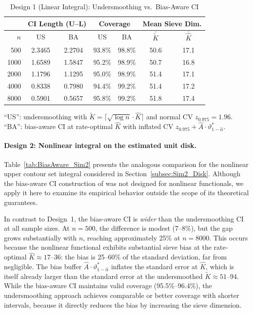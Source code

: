 \documentclass[12pt,american]{article}
\theoremstyle{definition}
\theoremstyle{plain}
\theoremstyle{definition}
\theoremstyle{plain}
\theoremstyle{plain}
\theoremstyle{plain}
\theoremstyle{plain}
\theoremstyle{plain}
\begin{document}
\begin{table}[!h]
\centering
\caption{Design 1 (Linear Integral): Undersmoothing vs.\ Bias-Aware CI}
\label{tab:BiasAware_Sim1}
\begin{tabular}{r|cc|cc|cc}
\toprule
 & \multicolumn{2}{c|}{CI Length (U--L)} & \multicolumn{2}{c|}{Coverage} & \multicolumn{2}{c}{Mean Sieve Dim.} \\
\midrule
$n$ & US & BA & US & BA & $\bar{\tilde{K}}$ & $\bar{\hat{K}}$ \\
\midrule
  500  & 2.3465 & 2.2704 & 93.8\% & 98.8\% & 50.6 & 17.1 \\
 1000  & 1.6589 & 1.5847 & 95.2\% & 98.9\% & 50.7 & 16.8 \\
 2000  & 1.1796 & 1.1295 & 95.0\% & 98.9\% & 51.4 & 17.1 \\
 4000  & 0.8338 & 0.7980 & 94.4\% & 99.2\% & 51.4 & 17.2 \\
 8000  & 0.5901 & 0.5657 & 95.8\% & 99.2\% & 51.8 & 17.4 \\
\bottomrule
\end{tabular}

\vspace{0.5em}
\parbox{\textwidth}{\footnotesize
``US'': undersmoothing with $\tilde{K} = \lceil\sqrt{\log n}\cdot\hat{K}\rceil$ and normal CV $z_{0.975}=1.96$.
``BA'': bias-aware CI at rate-optimal $\hat{K}$ with inflated CV $z_{0.975} + \hat{A}\cdot\vartheta^*_{1-\hat{\alpha}}$.
}
\end{table}


\paragraph{Design 2: Nonlinear integral on the estimated unit disk.}
Table~\ref{tab:BiasAware_Sim2} presents the analogous comparison for the nonlinear upper contour set integral considered in Section~\ref{subsec:Sim2_Disk}. Although the bias-aware CI construction of \citet*{chen2025adaptive} was not designed for nonlinear functionals, we apply it here to examine its empirical behavior outside the scope of its theoretical guarantees.

In contrast to Design~1, the bias-aware CI is \emph{wider} than the undersmoothing CI at all sample sizes. At $n=500$, the difference is modest (7--8\%), but the gap grows substantially with $n$, reaching approximately 25\% at $n=8000$. This occurs because the nonlinear functional exhibits substantial sieve bias at the rate-optimal $\hat{K}\approx 17$--$36$: the bias is 25--60\% of the standard deviation, far from negligible. The bias buffer $\hat{A}\cdot\vartheta^*_{1-\hat{\alpha}}$ inflates the standard error at $\hat{K}$, which is itself already larger than the standard error at the undersmoothed $\tilde{K}\approx 51$--$94$. While the bias-aware CI maintains valid coverage (95.5\%--96.4\%), the undersmoothing approach achieves comparable or better coverage with shorter intervals, because it directly reduces the bias by increasing the sieve dimension.
\end{document}
